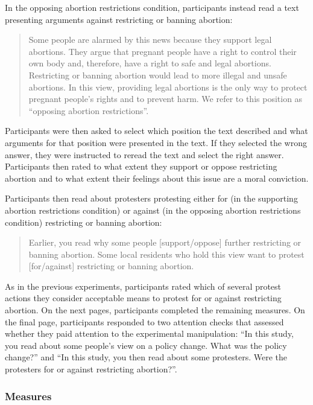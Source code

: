 \documentclass[twocolumn, 11pt, letterpaper]{article}
\begin{document}
\noindent In the opposing abortion restrictions condition, participants
instead read a text presenting arguments against restricting or banning
abortion:

\begin{quote}
Some people are alarmed by this news because they support legal
abortions. They argue that pregnant people have a right to control their
own body and, therefore, have a right to safe and legal abortions.
Restricting or banning abortion would lead to more illegal and unsafe
abortions. In this view, providing legal abortions is the only way to
protect pregnant people's rights and to prevent harm. We refer to this
position as ``opposing abortion restrictions''.
\end{quote}

\noindent Participants were then asked to select which position the text
described and what arguments for that position were presented in the
text. If they selected the wrong answer, they were instructed to reread
the text and select the right answer. Participants then rated to what
extent they support or oppose restricting abortion and to what extent
their feelings about this issue are a moral conviction.

Participants then read about protesters protesting either for (in the
supporting abortion restrictions condition) or against (in the opposing
abortion restrictions condition) restricting or banning abortion:

\begin{quote}
Earlier, you read why some people {[}support/oppose{]} further
restricting or banning abortion. Some local residents who hold this view
want to protest {[}for/against{]} restricting or banning abortion.
\end{quote}

\noindent As in the previous experiments, participants rated which of
several protest actions they consider acceptable means to protest for or
against restricting abortion. On the next pages, participants completed
the remaining measures. On the final page, participants responded to two
attention checks that assessed whether they paid attention to the
experimental manipulation: ``In this study, you read about some people's
view on a policy change. What was the policy change?'' and ``In this
study, you then read about some protesters. Were the protesters for or
against restricting abortion?''.

\hypertarget{measures-2}{%
\subsubsection{Measures}\label{measures-2}}
\end{document}
